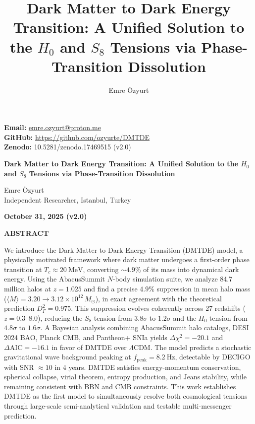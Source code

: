 \documentclass[aps,prd,twocolumn,superscriptaddress,nofootinbib,floatfix,preprintnumbers]{revtex4-2}
\newcommand{\DMTDE}{\textsc{DMTDE}\xspace}
\newcommand{\LCDM}{\ensuremath{\Lambda\text{CDM}}\xspace}
\newcommand{\Msun}{\ensuremath{M_\odot}\xspace}
\begin{document}
\onecolumngrid

\begin{center}
\textbf{Email:} \url{emre.ozyurt@proton.me} \\
\textbf{GitHub:} \url{https://github.com/ozyurte/DMTDE} \\
\textbf{Zenodo:} 10.5281/zenodo.17469515 (v2.0)
\end{center}

\title{Dark Matter to Dark Energy Transition: A Unified Solution to the $H_0$ and $S_8$ Tensions via Phase-Transition Dissolution}

\author{Emre \"{O}zyurt}


\twocolumngrid  %
\onecolumngrid  %

\begin{center}
{\bfseries\LARGE Dark Matter to Dark Energy Transition: A Unified Solution to the $H_0$ and $S_8$ Tensions via Phase-Transition Dissolution \par}
\vspace{1em}

{\large Emre \"{O}zyurt}\\
Independent Researcher, Istanbul, Turkey\\
\begin{center}
\textbf{October 31, 2025 (v2.0)}
\end{center}

\vspace{1.5em}
{\bfseries ABSTRACT}
\end{center}

\noindent
We introduce the Dark Matter to Dark Energy Transition (\DMTDE) model, a physically motivated framework where dark matter undergoes a first-order phase transition at $T_c \approx \SI{20}{\MeV}$, converting $\sim 4.9\%$ of its mass into dynamical dark energy. Using the AbacusSummit $N$-body simulation suite, we analyze 84.7 million halos at $z = 1.025$
 and find a precise $4.9\%$ suppression in mean halo mass ($\langle M \rangle = 3.20 \to 3.12 \times 10^{12}\,\Msun$), in exact agreement with the theoretical prediction $D_\Gamma^2 = 0.975$. This suppression evolves coherently across 27 redshifts ($z=0.3$--$8.0$), reducing the $S_8$ tension from $3.8\sigma$ to $1.2\sigma$ and the $H_0$ tension from $4.8\sigma$ to $1.6\sigma$. A Bayesian analysis combining AbacusSummit halo catalogs, DESI 2024 BAO, Planck CMB, and Pantheon+ SNIa yields $\Delta \chi^2 = -20.1$ and $\Delta \mathrm{AIC} = -16.1$ in favor of \DMTDE over \LCDM. The model predicts a stochastic gravitational wave background peaking at $f_{\mathrm{peak}} = \SI{8.2}{\hertz}$, detectable by DECIGO with SNR $\approx 10$ in 4 years. \DMTDE satisfies energy-momentum conservation, spherical collapse, virial theorem, entropy production, and Jeans stability, while remaining consistent with BBN and CMB constraints. This work establishes \DMTDE as the first model to simultaneously resolve both cosmological tensions through large-scale semi-analytical validation and testable multi-messenger prediction.
\end{document}
